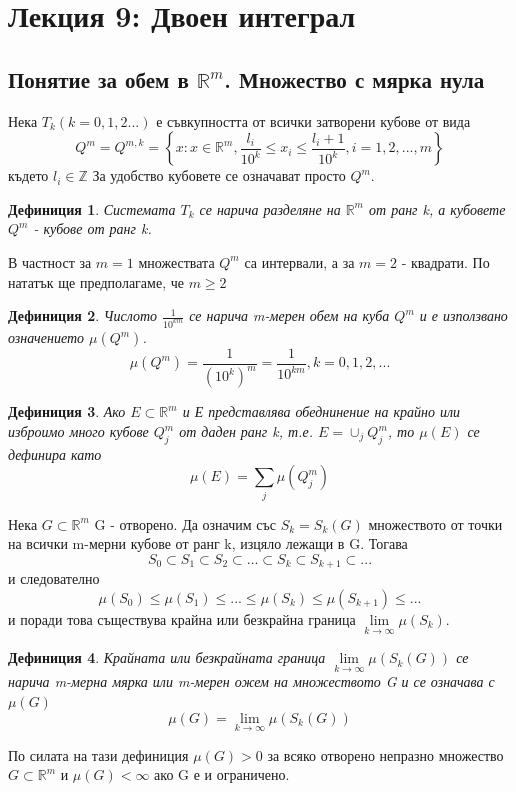 \documentclass[a4paper,fleqn,12pt]{article}
\newtheorem{definition}{Дефиниция}[subsection]
\theoremstyle{definition}
\begin{document}
\newpage
\section{Лекция 9: Двоен интеграл}

\subsection{Понятие за обем в $\mathbb{R}^m$. Множество с мярка нула}
Нека $T_k (k=0,1,2...)$ е съвкупността от всички затворени кубове от вида 
$$Q^m = Q^{m,k} = \left \{ x: x \in \mathbb{R}^m,  \frac{l_i}{10^k} \leq x_i \leq  \frac{l_i + 1}{10^k}, i = 1,2,...,m \right \}$$
където $l_i \in \mathbb{Z}$ За удобство кубовете се означават просто $Q^m$.

\begin{definition}
Системата $T_k$ се нарича разделяне на $\mathbb{R}^m$ от ранг k, а кубовете $Q^m$ - кубове от ранг k.
\end{definition}
В частност за $m = 1$ множествата $Q^m$ са интервали, а за $m = 2$ -  квадрати. По нататък ще предполагаме, че $m \geq 2$
\begin{definition}
Числото $\frac{1}{10^{km}}$ се нарича m-мерен обем на куба $Q^m$ и е използвано означението $\mu(Q^m)$.
$$\mu(Q^m) = \frac{1}{(10^k)^m} = \frac{1}{10^{km}}, k = 0,1,2,...$$
\end{definition}
 
\begin{definition}
Ако $E \subset \mathbb{R}^m$ и Е представлява обеднинение на крайно или изброимо много кубове $Q_j ^m$ от даден ранг k, т.е. $E = \cup_j Q_j ^m$, то $\mu(E)$ се дефинира като 
$$\mu(E) = \sum_j \mu(Q_j ^m)$$
\end{definition}
Нека $G \subset \mathbb{R}^m$ G - отворено. Да означим със $S_k = S_k(G)$ множеството от точки на всички m-мерни кубове от ранг k, изцяло лежащи в G. Тогава
$$S_0 \subset S_1 \subset S_2 \subset ... \subset S_k \subset S_{k+1} \subset ...$$
и следователно
$$\mu(S_0) \leq \mu(S_1) \leq ... \leq \mu(S_k) \leq \mu(S_{k+1}) \leq ... $$
и поради това съществува крайна или безкрайна граница $\lim\limits_{k \to \infty} \mu(S_k)$.

\begin{definition}
Крайната или безкрайната граница $\lim\limits_{k \to \infty} \mu(S_k(G))$ се нарича m-мерна мярка или m-мерен ожем на множеството G и се означава с $\mu(G)$
$$\mu(G) = \lim\limits_{k \to \infty} \mu(S_k(G))$$
\end{definition}
По силата на тази дефиниция $\mu(G) >0$ за всяко отворено непразно множество $G \subset \mathbb{R}^m$ и $\mu(G) < \infty$ ако G е и ограничено.\\
\end{document}
